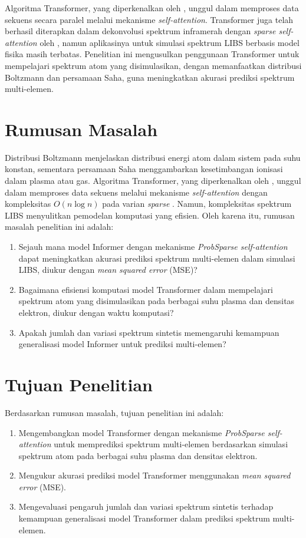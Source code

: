 \par Algoritma Transformer, yang diperkenalkan oleh \cite{vaswani-2017}, unggul dalam memproses data sekuens secara paralel melalui mekanisme \textit{self-attention}. Transformer juga telah berhasil diterapkan dalam dekonvolusi spektrum inframerah dengan \textit{sparse self-attention} oleh \cite{gao2024}, namun aplikasinya untuk simulasi spektrum LIBS berbasis model fisika masih terbatas. Penelitian ini mengusulkan penggunaan Transformer untuk mempelajari spektrum atom yang disimulasikan, dengan memanfaatkan distribusi Boltzmann dan persamaan Saha, guna meningkatkan akurasi prediksi spektrum multi-elemen.


\section{Rumusan Masalah}
\par Distribusi Boltzmann menjelaskan distribusi energi atom dalam sistem pada suhu konstan, sementara persamaan Saha menggambarkan kesetimbangan ionisasi dalam plasma atau gas. Algoritma Transformer, yang diperkenalkan oleh \cite{vaswani-2017}, unggul dalam memproses data sekuens melalui mekanisme \textit{self-attention} dengan kompleksitas \( O(n \log n) \) pada varian \textit{sparse} \parencite{gao2024}. Namun, kompleksitas spektrum LIBS menyulitkan pemodelan komputasi yang efisien. Oleh karena itu, rumusan masalah penelitian ini adalah:
\begin{enumerate}
    \item Sejauh mana model Informer dengan mekanisme \textit{ProbSparse self-attention} dapat meningkatkan akurasi prediksi spektrum multi-elemen  dalam simulasi LIBS, diukur dengan \textit{mean squared error} (MSE)?
    \item Bagaimana efisiensi komputasi model Transformer dalam mempelajari spektrum atom yang disimulasikan pada berbagai suhu plasma dan densitas elektron, diukur dengan waktu komputasi?
    \item Apakah jumlah dan variasi spektrum sintetis memengaruhi kemampuan generalisasi model Informer untuk prediksi multi-elemen?
\end{enumerate}


\section{Tujuan Penelitian}
Berdasarkan rumusan masalah, tujuan penelitian ini adalah:
\begin{enumerate}

    \item Mengembangkan model Transformer dengan mekanisme \textit{ProbSparse self-attention} untuk memprediksi spektrum multi-elemen berdasarkan simulasi spektrum atom pada berbagai suhu plasma dan densitas elektron.
    \item Mengukur akurasi prediksi model Transformer menggunakan \textit{mean squared error} (MSE).
    \item Mengevaluasi pengaruh jumlah dan variasi spektrum sintetis terhadap kemampuan generalisasi model Transformer dalam prediksi spektrum multi-elemen.
\end{enumerate}
